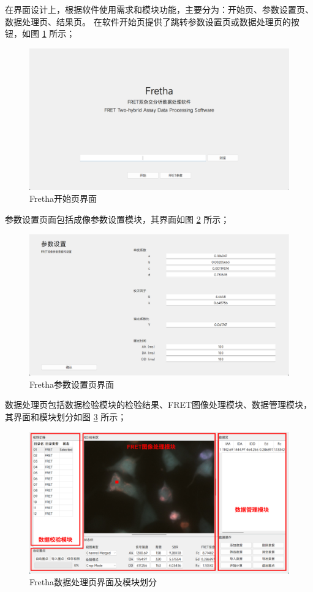 在界面设计上，根据软件使用需求和模块功能，主要分为：开始页、参数设置页、数据处理页、结果页。
在软件开始页提供了跳转参数设置页或数据处理页的按钮，如图 \ref{fig:开始页界面} 所示；
\begin{figure}[hbtp]
  \centering
  \includegraphics[width=0.9\linewidth]{../figures/2/2_开始页界面.png}
  \caption{Fretha开始页界面}
  \label{fig:开始页界面}
\end{figure}
参数设置页面包括成像参数设置模块，其界面如图 \ref{fig:参数设置页界面} 所示；
\begin{figure}[hbtp]
  \centering
  \includegraphics[width=0.9\linewidth]{../figures/2/2_参数设置界面.png}
  \caption{Fretha参数设置页界面}
  \label{fig:参数设置页界面}
\end{figure}
数据处理页包括数据检验模块的检验结果、FRET图像处理模块、数据管理模块，其界面和模块划分如图 \ref {fig:界面模块分布图} 所示；
\begin{figure}[hbtp]
  \centering
  \includegraphics[width=0.9\linewidth]{../figures/2/2_模块界面.png}
  \caption{Fretha数据处理页界面及模块划分}
  \label{fig:界面模块分布图}
\end{figure}
